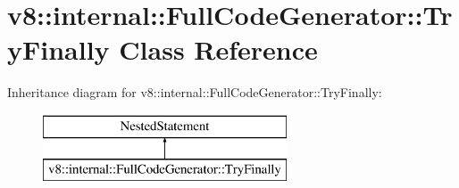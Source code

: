 \hypertarget{classv8_1_1internal_1_1_full_code_generator_1_1_try_finally}{}\section{v8\+:\+:internal\+:\+:Full\+Code\+Generator\+:\+:Try\+Finally Class Reference}
\label{classv8_1_1internal_1_1_full_code_generator_1_1_try_finally}
Inheritance diagram for v8\+:\+:internal\+:\+:Full\+Code\+Generator\+:\+:Try\+Finally\+:\begin{figure}[H]
\begin{center}
\leavevmode
\includegraphics[height=2.000000cm]{classv8_1_1internal_1_1_full_code_generator_1_1_try_finally}
\end{center}
\end{figure}
